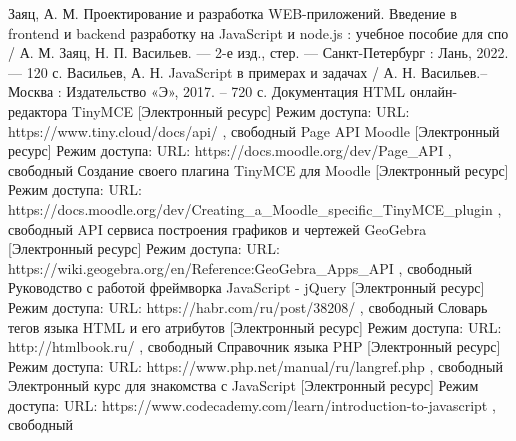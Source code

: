 \documentclass[14pt,Diplom]{diplomwork}
\begin{document}
\begin{thebibliography}{99}
 Заяц, А. М. Проектирование и разработка WEB-приложений. Введение в frontend и backend разработку на JavaScript и node.js : учебное пособие для спо / А. М. Заяц, Н. П. Васильев. — 2-е изд., стер. — Санкт-Петербург : Лань, 2022. — 120 с. 
 Васильев, А. Н. JavaScript в примерах и задачах / А. Н. Васильев.– Москва :
Издательство «Э», 2017. – 720 с.	
 Документация HTML онлайн-редактора TinyMCE [Электронный ресурс] Режим доступа: URL: https://www.tiny.cloud/docs/api/ , свободный
 Page API Moodle [Электронный ресурс] Режим доступа: URL: https://docs.moodle.org/dev/Page\_API , свободный
 Создание своего плагина TinyMCE для Moodle  [Электронный ресурс] Режим доступа: URL: https://docs.moodle.org/dev/Creating\_a\_Moodle\_specific\_TinyMCE\_plugin , свободный
 API сервиса построения графиков и чертежей GeoGebra [Электронный ресурс] Режим доступа: URL: https://wiki.geogebra.org/en/Reference:GeoGebra\_Apps\_API , свободный
 Руководство с работой фреймворка JavaScript - jQuery [Электронный ресурс] Режим доступа: URL: https://habr.com/ru/post/38208/ , свободный
 Словарь тегов языка HTML и его атрибутов [Электронный ресурс] Режим доступа: URL: http://htmlbook.ru/ , свободный
 Справочник языка PHP [Электронный ресурс] Режим доступа: URL: https://www.php.net/manual/ru/langref.php	 , свободный
 Электронный курс для знакомства с JavaScript [Электронный ресурс] Режим доступа: URL: https://www.codecademy.com/learn/introduction-to-javascript	 , свободный
\end{thebibliography}

 
\end{document}
